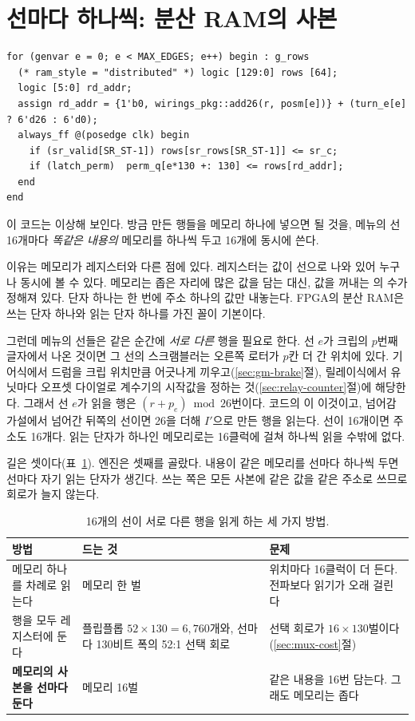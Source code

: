 \section{선마다 하나씩: 분산 RAM의 사본}\label{sec:e-ram}

\begin{lstlisting}[language=SV,caption={\code{bombe\_engine.sv}: 메뉴의 선마다 행 메모리의 사본을 둔다.},label={lst:e-ram}]
for (genvar e = 0; e < MAX_EDGES; e++) begin : g_rows
  (* ram_style = "distributed" *) logic [129:0] rows [64];
  logic [5:0] rd_addr;
  assign rd_addr = {1'b0, wirings_pkg::add26(r, posm[e])} + (turn_e[e] ? 6'd26 : 6'd0);
  always_ff @(posedge clk) begin
    if (sr_valid[SR_ST-1]) rows[sr_rows[SR_ST-1]] <= sr_c;
    if (latch_perm)  perm_q[e*130 +: 130] <= rows[rd_addr];
  end
end
\end{lstlisting}

이 코드는 이상해 보인다. 방금 만든 행들을 메모리 하나에 넣으면 될 것을, 메뉴의 선 16개마다 \emph{똑같은
내용의} 메모리를 하나씩 두고 16개에 동시에 쓴다.

\Why 이유는 메모리가 레지스터와 다른 점에 있다. 레지스터는 값이 선으로 나와 있어 누구나 동시에 볼 수 있다.
메모리는 좁은 자리에 많은 값을 담는 대신, 값을 꺼내는 의 수가 정해져 있다. 단자 하나는
한 번에 주소 하나의 값만 내놓는다. FPGA의 분산 RAM은 쓰는 단자 하나와 읽는 단자 하나를 가진 꼴이 기본이다.

그런데 메뉴의 선들은 같은 순간에 \emph{서로 다른} 행을 필요로 한다. 선 $e$가 크립의 $p$번째 글자에서 나온
것이면 그 선의 스크램블러는 오른쪽 로터가 $p$칸 더 간 위치에 있다. 기어식에서 드럼을 크립 위치만큼
어긋나게 끼우고(\ref{sec:gm-brake}절), 릴레이식에서 유닛마다 오프셋 다이얼로 계수기의 시작값을 정하는
것(\ref{sec:relay-counter}절)에 해당한다. 그래서 선 $e$가 읽을 행은 $(r + p_e) \bmod 26$번이다. 코드의
이 이것이고, 넘어감 가설에서 넘어간 뒤쪽의 선이면 26을 더해 $I'$으로 만든 행을 읽는다.
선이 16개이면 주소도 16개다. 읽는 단자가 하나인 메모리로는 16클럭에 걸쳐 하나씩 읽을 수밖에 없다.

길은 셋이다(표~\ref{tab:g-e-ram}). 엔진은 셋째를 골랐다. 내용이 같은 메모리를 선마다 하나씩 두면 선마다
자기 읽는 단자가 생긴다. 쓰는 쪽은 모든 사본에 같은 값을 같은 주소로 쓰므로 회로가 늘지 않는다.

\begin{table}[ht]
\centering
\caption{16개의 선이 서로 다른 행을 읽게 하는 세 가지 방법.}
\label{tab:g-e-ram}
\small
\begin{tabularx}{\linewidth}{l>{\raggedright\arraybackslash}X>{\raggedright\arraybackslash}X}
\toprule
방법 & 드는 것 & 문제 \\
\midrule
메모리 하나를 차례로 읽는다 & 메모리 한 벌 & 위치마다 16클럭이 더 든다. 전파보다 읽기가 오래 걸린다 \\
행을 모두 레지스터에 둔다 & 플립플롭 $52 \times 130 = 6{,}760$개와, 선마다 130비트 폭의 52:1 선택 회로 &
  선택 회로가 $16 \times 130$벌이다(\ref{sec:mux-cost}절) \\
\textbf{메모리의 사본을 선마다 둔다} & 메모리 16벌 & 같은 내용을 16번 담는다. 그래도 메모리는 좁다 \\
\bottomrule
\end{tabularx}
\end{table}

